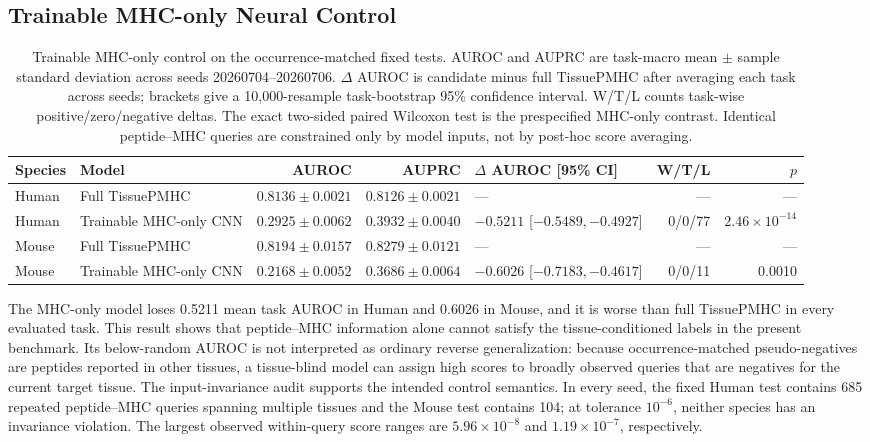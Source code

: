 \subsection{Trainable MHC-only Neural Control}

\begin{table}[t]
\centering
\caption{Trainable MHC-only control on the occurrence-matched fixed tests. AUROC and AUPRC are task-macro mean $\pm$ sample standard deviation across seeds 20260704--20260706. $\Delta$ AUROC is candidate minus full TissuePMHC after averaging each task across seeds; brackets give a 10,000-resample task-bootstrap 95\% confidence interval. W/T/L counts task-wise positive/zero/negative deltas. The exact two-sided paired Wilcoxon test is the prespecified MHC-only contrast. Identical peptide--MHC queries are constrained only by model inputs, not by post-hoc score averaging.}
\label{tab:trainable-tissue-blind-control}
\fontsize{7.5}{8.5}\selectfont
\setlength{\tabcolsep}{3.0pt}
\begin{tabularx}{\textwidth}{@{}llrr>{\raggedleft\arraybackslash}p{3.2cm}rr@{}}
\toprule
Species & Model & AUROC & AUPRC & $\Delta$ AUROC [95\% CI] & W/T/L & $p$ \\
\midrule
Human & Full TissuePMHC & $0.8136\pm0.0021$ & $0.8126\pm0.0021$ & --- & --- & --- \\
Human & Trainable MHC-only CNN & $0.2925\pm0.0062$ & $0.3932\pm0.0040$ & $-0.5211$ [$-0.5489,-0.4927$] & 0/0/77 & $2.46\times10^{-14}$ \\
\midrule
Mouse & Full TissuePMHC & $0.8194\pm0.0157$ & $0.8279\pm0.0121$ & --- & --- & --- \\
Mouse & Trainable MHC-only CNN & $0.2168\pm0.0052$ & $0.3686\pm0.0064$ & $-0.6026$ [$-0.7183,-0.4617$] & 0/0/11 & 0.0010 \\
\bottomrule
\end{tabularx}
\end{table}

The MHC-only model loses 0.5211 mean task AUROC in Human and 0.6026 in Mouse, and it is worse than full TissuePMHC in every evaluated task. This result shows that peptide--MHC information alone cannot satisfy the tissue-conditioned labels in the present benchmark. Its below-random AUROC is not interpreted as ordinary reverse generalization: because occurrence-matched pseudo-negatives are peptides reported in other tissues, a tissue-blind model can assign high scores to broadly observed queries that are negatives for the current target tissue. The input-invariance audit supports the intended control semantics. In every seed, the fixed Human test contains 685 repeated peptide--MHC queries spanning multiple tissues and the Mouse test contains 104; at tolerance $10^{-6}$, neither species has an invariance violation. The largest observed within-query score ranges are $5.96\times10^{-8}$ and $1.19\times10^{-7}$, respectively.

